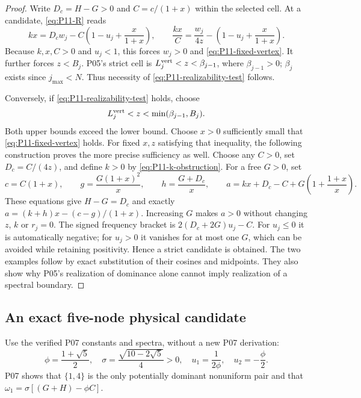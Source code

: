 \begin{proof}
Write $D_c=H-G>0$ and $C=c/(1+x)$ within the selected cell.
At a candidate, \eqref{eq:P11-R} reads
\begin{equation}
 kx=D_cw_j-C\left(1-u_j+\frac{x}{1+x}\right),\qquad
 \frac{kx}{C}=\frac{w_j}{4z}-\left(1-u_j+\frac{x}{1+x}\right).
 \label{eq:P11-k-obstruction}
\end{equation}
Because $k,x,C>0$ and $u_j<1$, this forces $w_j>0$ and
\eqref{eq:P11-fixed-vertex}. It further forces $z<B_j$.
P05's strict cell is
$L_j^{\rm vert}<z<\beta_{j-1}$, where $\beta_{j-1}>0$;
$\beta_j$ exists since $j_{\max}<N$. Thus necessity of
\eqref{eq:P11-realizability-test} follows.

Conversely, if \eqref{eq:P11-realizability-test} holds, choose
\[
 L_j^{\rm vert}<z<\min(\beta_{j-1},B_j).
\]
Both upper bounds exceed the lower bound. Choose $x>0$ sufficiently
small that \eqref{eq:P11-fixed-vertex} holds. For fixed $x,z$
satisfying that inequality, the following construction proves the more
precise sufficiency as well. Choose any $C>0$, set $D_c=C/(4z)$,
and define $k>0$ by \eqref{eq:P11-k-obstruction}. For a free $G>0$,
set
\begin{equation}
 c=C(1+x),\qquad g=\frac{G(1+x)^2}{x},\qquad
 h=\frac{G+D_c}{x},\qquad
 a=kx+D_c-C+G\left(1+\frac{1+x}{x}\right).
 \label{eq:P11-realization}
\end{equation}
These equations give $H-G=D_c$ and exactly
$a=(k+h)x-(c-g)/(1+x)$. Increasing $G$ makes $a>0$
without changing $z$, $k$ or $r_j=0$. The signed frequency bracket
is $2(D_c+2G)u_j-C$. For $u_j\le0$ it is automatically negative;
for $u_j>0$ it vanishes for at most one $G$, which can be avoided
while retaining positivity. Hence a strict candidate is obtained.
The two examples follow by exact substitution of their cosines and
midpoints. They also show why P05's realization of dominance alone
cannot imply realization of a spectral boundary.
\end{proof}

\subsection{An exact five-node physical candidate}
Use the verified P07 constants and spectra, without a new P07 derivation:
\[
 \phi=\frac{1+\sqrt5}{2},\quad
 \sigma=\frac{\sqrt{10-2\sqrt5}}4>0,\quad
 u_1=\frac1{2\phi},\quad u_2=-\frac\phi2.
\]
P07 shows that $\{1,4\}$ is the only potentially dominant nonuniform
pair and that $\omega_1=\sigma[(G+H)-\phi C]$.

